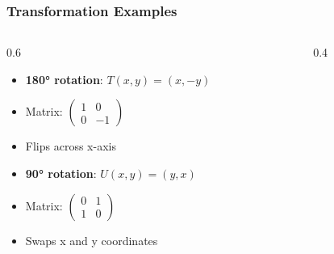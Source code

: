 \begin{frame}[fragile]\frametitle{Transformation Examples}
  \begin{columns}
    \begin{column}[T]{0.6\linewidth}
      \begin{itemize}
        \item \textbf{180° rotation}: $T(x,y) = (x, -y)$
        \item Matrix: $\begin{pmatrix} 1 & 0 \\ 0 & -1 \end{pmatrix}$
        \item Flips across x-axis
        \item \textbf{90° rotation}: $U(x,y) = (y, x)$
        \item Matrix: $\begin{pmatrix} 0 & 1 \\ 1 & 0 \end{pmatrix}$
        \item Swaps x and y coordinates
      \end{itemize}
    \end{column}
    \begin{column}[T]{0.4\linewidth}
      \begin{center}
      \end{center}
    \end{column}
  \end{columns}
\end{frame}

